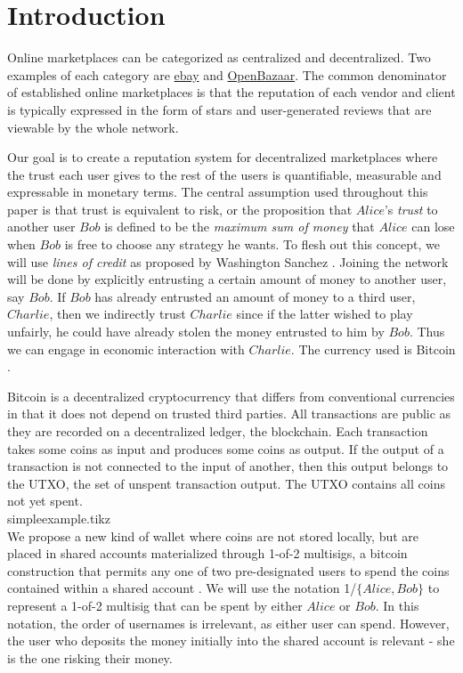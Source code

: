 \section{Introduction}
  Online marketplaces can be categorized as centralized and decentralized.
  Two examples of each category are \href{http://www.ebay.com}{ebay} and \href{https://openbazaar.org/}{OpenBazaar}.
  The common denominator of established online marketplaces is that the reputation of each vendor and client is typically
  expressed in the form of stars and user-generated reviews that are viewable by the whole network.

  Our goal is to create a reputation system for decentralized marketplaces where the trust each user gives to the rest of
  the users is quantifiable, measurable and expressable in monetary terms. The central assumption used throughout this paper
  is that trust is equivalent to risk, or the proposition that $Alice$'s \textit{trust} to another user $Bob$ is defined to
  be the \textit{maximum sum of money} that $Alice$ can lose when $Bob$ is free to choose any strategy he wants. To flesh
  out this concept, we will use \textit{lines of credit} as proposed by Washington Sanchez \cite{loc}. Joining the network
  will be done by explicitly entrusting a certain amount of money to another user, say $Bob$. If $Bob$ has already entrusted
  an amount of money to a third user, $Charlie$, then we indirectly trust $Charlie$ since if the latter wished to play
  unfairly, he could have already stolen the money entrusted to him by $Bob$. Thus we can engage in economic interaction
  with $Charlie$. The currency used is Bitcoin \cite{bitcoin}.

  Bitcoin is a decentralized cryptocurrency that differs from conventional currencies in that it does not depend on trusted
  third parties. All transactions are public as they are recorded on a decentralized ledger, the blockchain. Each transaction
  takes some coins as input and produces some coins as output. If the output of a transaction is not connected to the input
  of another, then this output belongs to the UTXO, the set of unspent transaction output. The UTXO contains all coins not
  yet spent.
  \medskip \ \\
  {simpleexample.tikz} \smallskip \ \\
  We propose a new kind of wallet where coins are not stored locally, but are placed in shared accounts materialized through
  1-of-2 multisigs, a bitcoin construction that permits any one of two pre-designated users to spend the coins contained
  within a shared account \cite{masteringbitcoin}. We will use the notation 1/$\{Alice, Bob\}$ to represent a 1-of-2
  multisig that can be spent by either $Alice$ or $Bob$. In this notation, the order of usernames is irrelevant, as either
  user can spend. However, the user who deposits the money initially into the shared account is relevant - she is the one
  risking their money.

